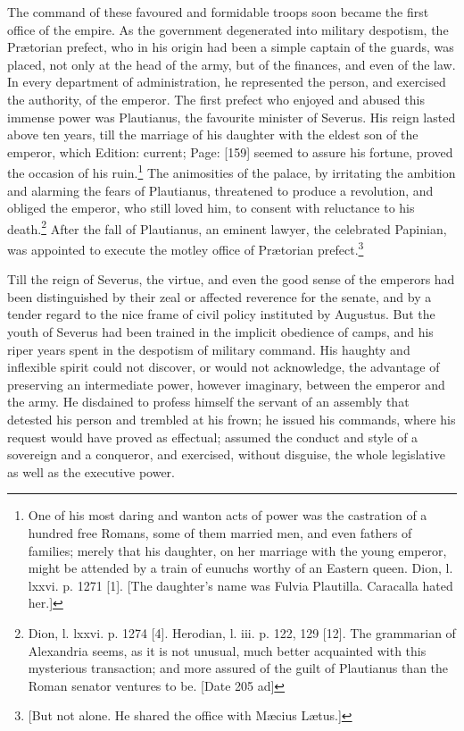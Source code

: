 The command of these favoured and formidable troops soon became the first office of the empire. As the government degenerated into military despotism, the Prætorian prefect, who in his origin had been a simple captain of the guards, was placed, not only at the head of the army, but of the finances, and even of the law. In every department of administration, he represented the person, and exercised the authority, of the emperor. The first prefect who enjoyed and abused this immense power was Plautianus, the favourite minister of Severus. His reign lasted above ten years, till the marriage of his daughter with the eldest son of the emperor, which Edition: current; Page: [159] seemed to assure his fortune, proved the occasion of his ruin.\footnote{One of his most daring and wanton acts of power was the castration of a hundred free Romans, some of them married men, and even fathers of families; merely that his daughter, on her marriage with the young emperor, might be attended by a train of eunuchs worthy of an Eastern queen. Dion, l. lxxvi. p. 1271 [1]. [The daughter\texthebrew{}’s name was Fulvia Plautilla. Caracalla hated her.]} The animosities of the palace, by irritating the ambition and alarming the fears of Plautianus, threatened to produce a revolution, and obliged the emperor, who still loved him, to consent with reluctance to his death.\footnote{Dion, l. lxxvi. p. 1274 [4]. Herodian, l. iii. p. 122, 129 [12]. The grammarian of Alexandria seems, as it is not unusual, much better acquainted with this mysterious transaction; and more assured of the guilt of Plautianus than the Roman senator ventures to be. [Date 205 ad]} After the fall of Plautianus, an eminent lawyer, the celebrated Papinian, was appointed to execute the motley office of Prætorian prefect.\footnote{[But not alone. He shared the office with Mæcius Lætus.]}

Till the reign of Severus, the virtue, and even the good sense of the emperors had been distinguished by their zeal or affected reverence for the senate, and by a tender regard to the nice frame of civil policy instituted by Augustus. But the youth of Severus had been trained in the implicit obedience of camps, and his riper years spent in the despotism of military command. His haughty and inflexible spirit could not discover, or would not acknowledge, the advantage of preserving an intermediate power, however imaginary, between the emperor and the army. He disdained to profess himself the servant of an assembly that detested his person and trembled at his frown; he issued his commands, where his request would have proved as effectual; assumed the conduct and style of a sovereign and a conqueror, and exercised, without disguise, the whole legislative as well as the executive power.

